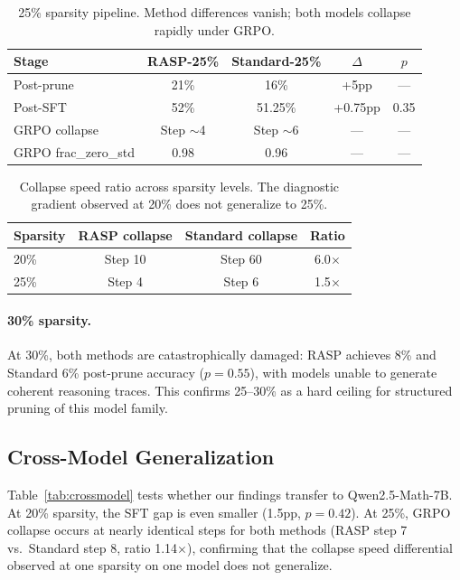 \documentclass[11pt,a4paper]{article}
\begin{document}
\begin{table}[t]
\centering
\small
\caption{25\% sparsity pipeline. Method differences vanish; both models collapse rapidly under GRPO.}
\label{tab:sparsity25}
\begin{tabular}{lcccc}
\toprule
\textbf{Stage} & \textbf{RASP-25\%} & \textbf{Standard-25\%} & $\Delta$ & $p$ \\
\midrule
Post-prune & 21\% & 16\% & +5pp & --- \\
Post-SFT & 52\% & 51.25\% & +0.75pp & 0.35 \\
GRPO collapse & Step $\sim$4 & Step $\sim$6 & --- & --- \\
GRPO frac\_zero\_std & 0.98 & 0.96 & --- & --- \\
\bottomrule
\end{tabular}
\end{table}

\begin{table}[t]
\centering
\small
\caption{Collapse speed ratio across sparsity levels. The diagnostic gradient observed at 20\% does not generalize to 25\%.}
\label{tab:collapse_gradient}
\begin{tabular}{lccc}
\toprule
\textbf{Sparsity} & \textbf{RASP collapse} & \textbf{Standard collapse} & \textbf{Ratio} \\
\midrule
20\% & Step 10 & Step 60 & 6.0$\times$ \\
25\% & Step 4 & Step 6 & 1.5$\times$ \\
\bottomrule
\end{tabular}
\end{table}

\paragraph{30\% sparsity.} At 30\%, both methods are catastrophically damaged: RASP achieves 8\% and Standard 6\% post-prune accuracy ($p=0.55$), with models unable to generate coherent reasoning traces. This confirms 25--30\% as a hard ceiling for structured pruning of this model family.

\subsection{Cross-Model Generalization}
\label{sec:crossmodel}

Table~\ref{tab:crossmodel} tests whether our findings transfer to Qwen2.5-Math-7B. At 20\% sparsity, the SFT gap is even smaller (1.5pp, $p=0.42$). At 25\%, GRPO collapse occurs at nearly identical steps for both methods (RASP step 7 vs.\ Standard step 8, ratio 1.14$\times$), confirming that the collapse speed differential observed at one sparsity on one model does not generalize.
\end{document}
